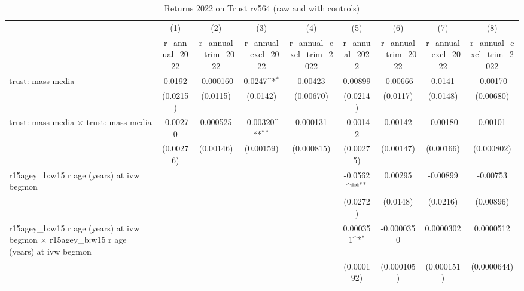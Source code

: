 \begin{table}[htbp]\centering
\def\sym#1{\ifmmode^{#1}\else\(^{#1}\)\fi}
\caption{Returns 2022 on Trust rv564 (raw and with controls)}
\begin{tabular}{l*{8}{c}}
\toprule
                &\multicolumn{1}{c}{(1)}&\multicolumn{1}{c}{(2)}&\multicolumn{1}{c}{(3)}&\multicolumn{1}{c}{(4)}&\multicolumn{1}{c}{(5)}&\multicolumn{1}{c}{(6)}&\multicolumn{1}{c}{(7)}&\multicolumn{1}{c}{(8)}\\
                &\multicolumn{1}{c}{r\_annual\_2022}&\multicolumn{1}{c}{r\_annual\_trim\_2022}&\multicolumn{1}{c}{r\_annual\_excl\_2022}&\multicolumn{1}{c}{r\_annual\_excl\_trim\_2022}&\multicolumn{1}{c}{r\_annual\_2022}&\multicolumn{1}{c}{r\_annual\_trim\_2022}&\multicolumn{1}{c}{r\_annual\_excl\_2022}&\multicolumn{1}{c}{r\_annual\_excl\_trim\_2022}\\
\midrule
trust: mass media&   0.0192         &-0.000160         &   0.0247\sym{*}  &  0.00423         &  0.00899         & -0.00666         &   0.0141         & -0.00170         \\
                & (0.0215)         & (0.0115)         & (0.0142)         &(0.00670)         & (0.0214)         & (0.0117)         & (0.0148)         &(0.00680)         \\
\addlinespace
trust: mass media $\times$ trust: mass media& -0.00270         & 0.000525         & -0.00320\sym{**} & 0.000131         & -0.00142         &  0.00142         & -0.00180         &  0.00101         \\
                &(0.00276)         &(0.00146)         &(0.00159)         &(0.000815)         &(0.00275)         &(0.00147)         &(0.00166)         &(0.000802)         \\
\addlinespace
r15agey\_b:w15 r age (years) at ivw begmon&                  &                  &                  &                  &  -0.0562\sym{**} &  0.00295         & -0.00899         & -0.00753         \\
                &                  &                  &                  &                  & (0.0272)         & (0.0148)         & (0.0216)         &(0.00896)         \\
\addlinespace
r15agey\_b:w15 r age (years) at ivw begmon $\times$ r15agey\_b:w15 r age (years) at ivw begmon&                  &                  &                  &                  & 0.000351\sym{*}  &-0.0000350         &0.0000302         &0.0000512         \\
                &                  &                  &                  &                  &(0.000192)         &(0.000105)         &(0.000151)         &(0.0000644)         \\

\end{tabular}
\end{table}
